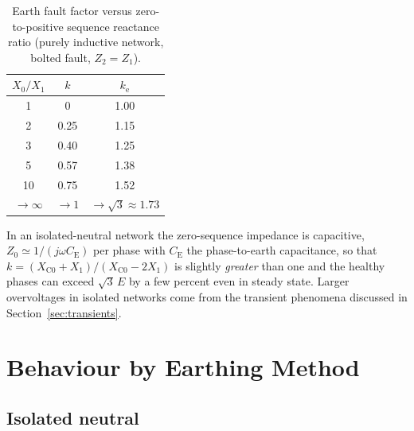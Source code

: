 \documentclass[a4paper,11pt]{article}
\begin{document}
\begin{table}[htb]
\centering
\caption{Earth fault factor versus zero-to-positive sequence reactance ratio
(purely inductive network, bolted fault, $Z_2=Z_1$).}
\label{tab:ke}
\begin{tabular}{ccc}
\toprule
$X_{0}/X_{1}$ & $k$ & $k_\mathrm{e}$ \\
\midrule
1 & 0 & 1.00 \\
2 & 0.25 & 1.15 \\
3 & 0.40 & 1.25 \\
5 & 0.57 & 1.38 \\
10 & 0.75 & 1.52 \\
$\to\infty$ & $\to 1$ & $\to\sqrt{3}\approx 1.73$ \\
\bottomrule
\end{tabular}
\end{table}

In an isolated-neutral network the zero-sequence impedance is capacitive,
$Z_{0}\simeq 1/(j\omega C_\mathrm{E})$ per phase with $C_\mathrm{E}$ the
phase-to-earth capacitance, so that
$k = (X_\mathrm{C0}+X_{1})/(X_\mathrm{C0}-2X_{1})$ is slightly \emph{greater}
than one and the healthy phases can exceed $\sqrt{3}\,E$ by a few percent even
in steady state. Larger overvoltages in isolated networks come from the
transient phenomena discussed in Section~\ref{sec:transients}.

\section{Behaviour by Earthing Method}
\label{sec:earthing}

\subsection{Isolated neutral}
\label{sec:isolated}
\end{document}
